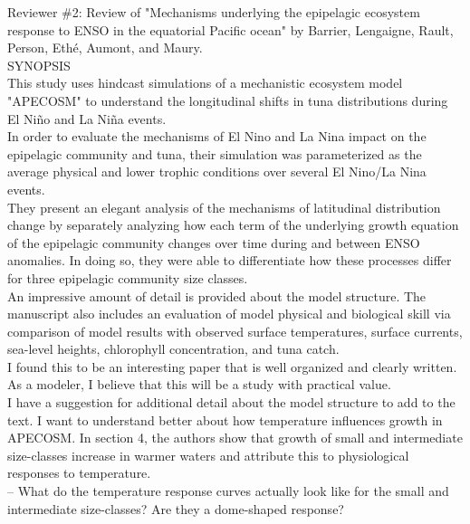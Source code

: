 \documentclass[12pt]{article}
\begin{document}
Reviewer \#2: Review of "Mechanisms underlying the epipelagic ecosystem response to ENSO in the equatorial Pacific ocean" by Barrier, Lengaigne, Rault, Person, Ethé, Aumont, and Maury.\\

SYNOPSIS \\

This study uses hindcast simulations of a mechanistic ecosystem model "APECOSM" to understand the longitudinal shifts in tuna distributions during El Niño and La Niña events.\\

In order to evaluate the mechanisms of El Nino and La Nina impact on the epipelagic community and tuna, their simulation was parameterized as the average physical and lower trophic conditions over several El Nino/La Nina events.\\

They present an elegant analysis of the mechanisms of latitudinal distribution change by separately analyzing how each term of the underlying growth equation of the epipelagic community changes over time during and between ENSO anomalies. In doing so, they were able to differentiate how these processes differ for three epipelagic community size classes.\\

An impressive amount of detail is provided about the model structure. The manuscript also includes an evaluation of model physical and biological skill via comparison of model results with observed surface temperatures, surface currents, sea-level heights, chlorophyll concentration, and tuna catch.\\

I found this to be an interesting paper that is well organized and clearly written. As a modeler, I believe that this will be a study with practical value.\\

I have a suggestion for additional detail about the model structure to add to the text. I want to understand better about how temperature influences growth in APECOSM. In section 4, the authors show that growth of small and intermediate size-classes increase in warmer waters and attribute this to physiological responses to temperature.\\

-- What do the temperature response curves actually look like for the small and intermediate size-classes? Are they a dome-shaped response?\\
\end{document}
